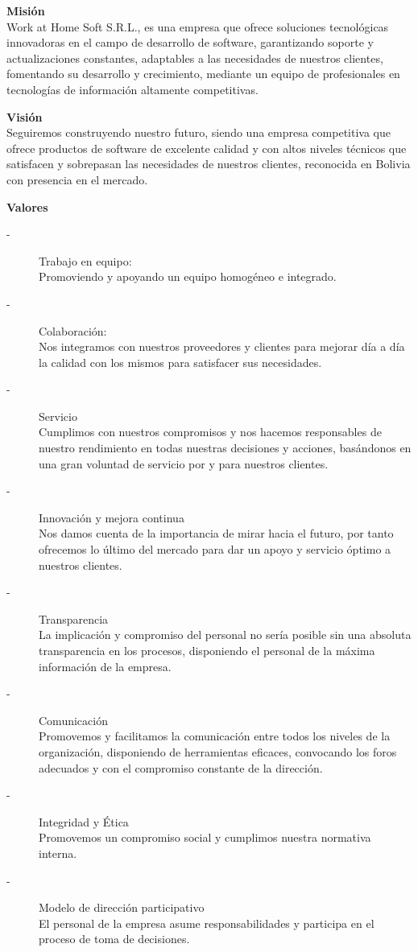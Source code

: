 \documentclass[11pt,letterpaper]{report}
\begin{document}
\begin{description}
\item {\bf Misi\'on }\\
Work at Home Soft S.R.L., es una empresa que ofrece soluciones tecnol\'ogicas innovadoras en el campo de
desarrollo de software, garantizando soporte y actualizaciones constantes, adaptables a las
necesidades de nuestros clientes, fomentando su desarrollo y crecimiento, mediante un equipo de
profesionales en tecnolog\'ias de informaci\'on altamente competitivas.
\item {\bf Visi\'on }\\
Seguiremos construyendo nuestro futuro, siendo una empresa competitiva que ofrece productos de
software de excelente calidad y con altos niveles t\'ecnicos que satisfacen y sobrepasan las
necesidades de nuestros clientes, reconocida en Bolivia con presencia en el mercado.
\item {\bf Valores}
\begin{description}
\item [-]Trabajo en equipo:\\
Promoviendo y apoyando un equipo homog\'eneo e integrado.
\item [-]Colaboraci\'on:\\
Nos integramos con nuestros proveedores y clientes para mejorar d\'ia a d\'ia la calidad con los
mismos para satisfacer sus necesidades.
\item [-]Servicio\\
Cumplimos con nuestros compromisos y nos hacemos responsables de nuestro rendimiento
en todas nuestras decisiones y acciones, bas\'andonos en una gran voluntad de servicio por y
para nuestros clientes.
\item [-]Innovaci\'on y mejora continua\\
Nos damos cuenta de la importancia de mirar hacia el futuro, por tanto ofrecemos lo \'ultimo del
mercado para dar un apoyo y servicio \'optimo a nuestros clientes.
\item [-]Transparencia\\
La implicaci\'on y compromiso del personal no ser\'ia posible sin una absoluta transparencia en
los procesos, disponiendo el personal de la m\'axima información de la empresa.
\item [-]Comunicaci\'on\\
Promovemos y facilitamos la comunicaci\'on entre todos los niveles de la organizaci\'on,
disponiendo de herramientas eficaces, convocando los foros adecuados y con el compromiso
constante de la direcci\'on.
\item [-]Integridad y \'Etica\\
Promovemos un compromiso social y cumplimos nuestra normativa interna.
\item [-]Modelo de direcci\'on participativo\\
El personal de la empresa asume responsabilidades y participa en el proceso de toma de
decisiones.
\end{description}
\end{description}
\end{document}

